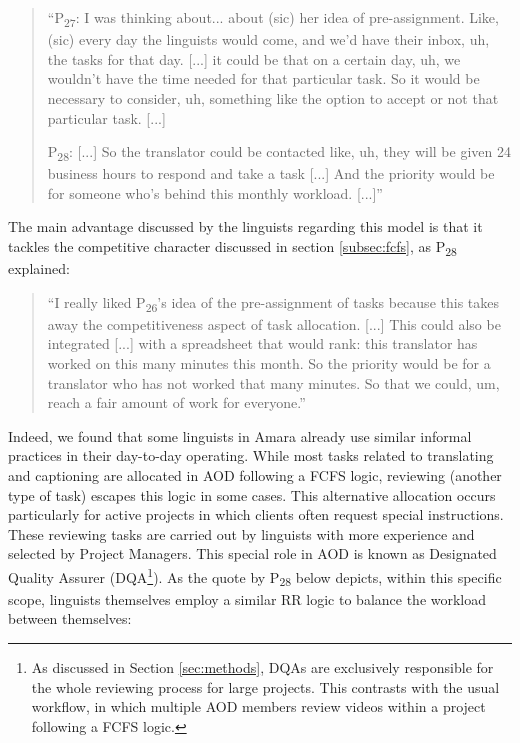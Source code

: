 \begin{quote}
    ``P\textsubscript{27}: I was thinking about... about (sic) her idea of pre-assignment. Like, (sic) every day the linguists would come, and we'd have their inbox, uh, the tasks for that day. [...] it could be that on a certain day, uh, we wouldn't have the time needed for that particular task. So it would be necessary to consider, uh, something like the option to accept or not that particular task. [...] 
    
    P\textsubscript{28}: [...] So the translator could be contacted like, uh, they will be given 24 business hours to respond and take a task [...] And the priority would be for someone who's behind this monthly workload. [...]''
\end{quote}

The main advantage discussed by the linguists regarding this model is that it tackles the competitive character discussed in section \ref{subsec:fcfs}, as P\textsubscript{28} explained: 
\begin{quote}
    ``I really liked P\textsubscript{26}'s idea of the pre-assignment of tasks because this takes away the competitiveness aspect of task allocation. [...] This could also be integrated [...] with a spreadsheet that would rank: this translator has worked on this many minutes this month. So the priority would be for a translator who has not worked that many minutes. So that we could, um, reach a fair amount of work for everyone.''
\end{quote}

Indeed, we found that some linguists in Amara already use similar informal practices in their day-to-day operating. While most tasks related to translating and captioning are allocated in AOD following a FCFS logic, reviewing (another type of task) escapes this logic in some cases. This alternative allocation occurs particularly for active projects in which clients often request special instructions. These reviewing tasks are carried out by linguists with more experience and selected by Project Managers. This special role in AOD is known as Designated Quality Assurer (DQA\footnote{As discussed in Section \ref{sec:methods}, DQAs are exclusively responsible for the whole reviewing process for large projects. This contrasts with the usual workflow, in which multiple AOD members review videos within a project following a FCFS logic.}). As the quote by P\textsubscript{28} below depicts, within this specific scope, linguists themselves employ a similar RR logic to balance the workload between themselves:

